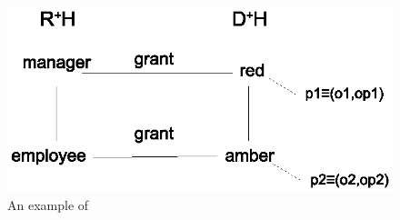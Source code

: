  \begin{figure}
 	\centering
 	\includegraphics[width=.7\textwidth]{ABAC16/two-sorted-rbac-example}
 	\caption{An example of \twoSortedRBAC{}}
 	\label{fig:two-sorted-rbac-example}
 \end{figure} 
